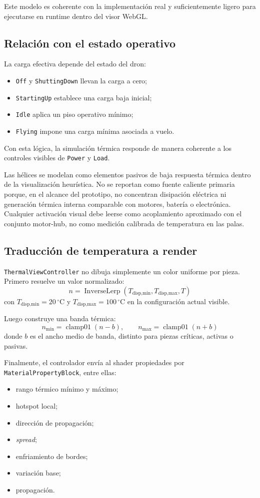 \documentclass[12pt,letterpaper]{article}
\begin{document}
\noindent Este modelo es coherente con la implementación real y suficientemente ligero para ejecutarse en runtime dentro del visor WebGL.

\subsection{Relación con el estado operativo}
La carga efectiva depende del estado del dron:
\begin{itemize}
    \item \texttt{Off} y \texttt{ShuttingDown} llevan la carga a cero;
    \item \texttt{StartingUp} establece una carga baja inicial;
    \item \texttt{Idle} aplica un piso operativo mínimo;
    \item \texttt{Flying} impone una carga mínima asociada a vuelo.
\end{itemize}

\noindent Con esta lógica, la simulación térmica responde de manera coherente a los controles visibles de \texttt{Power} y \texttt{Load}.

\noindent Las hélices se modelan como elementos pasivos de baja respuesta térmica dentro de la visualización heurística. No se reportan como fuente caliente primaria porque, en el alcance del prototipo, no concentran disipación eléctrica ni generación térmica interna comparable con motores, batería o electrónica. Cualquier activación visual debe leerse como acoplamiento aproximado con el conjunto motor-hub, no como medición calibrada de temperatura en las palas.

\subsection{Traducción de temperatura a render}
\texttt{ThermalViewController} no dibuja simplemente un color uniforme por pieza. Primero resuelve un valor normalizado:
\[
n = \operatorname{InverseLerp}(T_{\text{disp,min}}, T_{\text{disp,max}}, T)
\]
con $T_{\text{disp,min}}=20\,^{\circ}\text{C}$ y $T_{\text{disp,max}}=100\,^{\circ}\text{C}$ en la configuración actual visible.

Luego construye una banda térmica:
\[
n_{\min} = \operatorname{clamp01}(n-b),
\qquad
n_{\max} = \operatorname{clamp01}(n+b)
\]
donde $b$ es el ancho medio de banda, distinto para piezas críticas, activas o pasivas.

\noindent Finalmente, el controlador envía al shader propiedades por \texttt{MaterialPropertyBlock}, entre ellas:
\begin{itemize}
    \item rango térmico mínimo y máximo;
    \item hotspot local;
    \item dirección de propagación;
    \item \textit{spread};
    \item enfriamiento de bordes;
    \item variación base;
    \item propagación.
\end{itemize}
\end{document}
